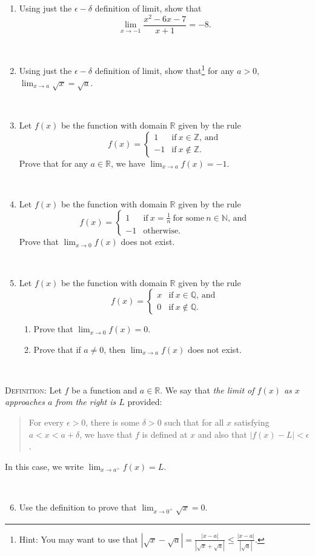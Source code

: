 \documentclass{amsart}
\def\R{\mathbb R}
\def\N{\mathbb N}
\def\Q{\mathbb Q}
\def\Z{\mathbb Z}
\def\e{\epsilon}
\def\d{\delta}
\begin{document}
\begin{enumerate}

\item Using just the $\e-\d$ definition of limit, show that
\[ \lim_{x\to -1} \frac{x^2 - 6x - 7}{x+1} = -8.\]

\

\item Using just the $\e-\d$ definition of limit, show that\footnote{Hint: You may want to use that $\displaystyle |\sqrt{x} - \sqrt{a} | = \frac{ |x-a| }{|\sqrt{x} + \sqrt{a} | }\leq\frac{ |x-a| }{|\sqrt{a} |}.$} for any $a>0$, $\lim_{x\to a} \sqrt{x} = \sqrt{a}$.

\

	\item Let $f(x)$ be the function with domain $\R$ given by the rule
	\[ f(x) = \begin{cases} 1 &\textrm{if} \ x\in \Z, \, \textrm{and} \\ 
		-1 &\text{if} \ x\notin \Z.\end{cases}\]
		Prove that for any $a\in \R$, we have $\lim_{x \to a} f(x)=-1$.
		
		\
		
			\item Let $f(x)$ be the function with domain $\R$ given by the rule
	\[ f(x) = \begin{cases} 1 &\textrm{if} \ x=\frac{1}{n} \ \textrm{for some} \ n\in \N, \, \textrm{and} \\ 
		-1 &\textrm{otherwise}.\end{cases}\]
		Prove that $\lim_{x \to 0} f(x)$ does not exist.
		
				\
		
			\item Let $f(x)$ be the function with domain $\R$ given by the rule
	\[ f(x) = \begin{cases} x &\text{if} \ x\in \Q, \, \textrm{and} \\ 
		0 &\text{if} \ x\notin \Q.\end{cases}\]
		\begin{enumerate}
		\item Prove that $\lim_{x \to 0} f(x)=0$.
		\item Prove that if $a\neq 0$, then $\lim_{x\to a} f(x)$ does not exist.
	\end{enumerate}			
\end{enumerate}

\

\noindent \textsc{Definition:} Let $f$ be a function and $a\in \R$. We say that \emph{the limit of $f(x)$ as $x$ approaches $a$ from the right is $L$} provided:
\begin{quote} For every $\e>0$, there is some $\d>0$ such that for all $x$ satisfying $a<x<a+\d$, we have that $f$ is defined at $x$ and also that $|f(x) - L| < \e$.
\end{quote}
In this case, we write $\displaystyle \lim_{x\to a^+} f(x) = L$.

\

\begin{enumerate} \setcounter{enumi}{5}
\item Use the definition to prove that $\lim_{x\to 0^+} \sqrt{x} = 0$.
\end{enumerate}
\end{document}

